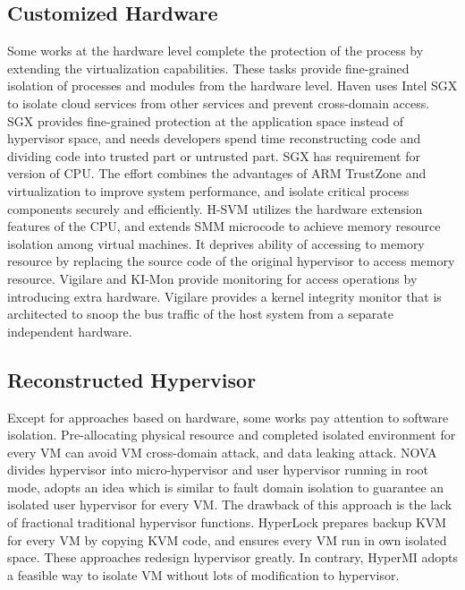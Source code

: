\documentclass[conference]{IEEEtran}
\begin{document}
\subsection{Customized Hardware }
Some works at the hardware level complete the protection of the process by extending the virtualization capabilities. These tasks provide fine-grained isolation of processes and modules from the hardware level. Haven \cite{haven} uses Intel SGX\cite{Hoekstra13cuvillo,Mckeen2013Innovative} to isolate cloud services from other services and prevent cross-domain access. SGX provides fine-grained protection at the application space instead of hypervisor space, and needs developers spend time reconstructing code and dividing code into trusted part or untrusted part. SGX has requirement for version of CPU. The effort \cite{Cho2016Hardware} combines the advantages of ARM TrustZone and virtualization to improve system performance, and isolate critical process components securely and efficiently. H-SVM\cite{Jin2015H} utilizes the hardware extension features of the CPU, and extends SMM microcode to achieve memory resource isolation among virtual machines. It deprives ability of accessing to memory resource by replacing the source code of the original hypervisor to access memory resource. Vigilare\cite{Moon2012Vigilare} and KI-Mon \cite{Lee2013KI} provide monitoring for access operations by introducing extra hardware. Vigilare provides a kernel integrity monitor that is architected to snoop the bus traffic of the host system from a separate independent hardware.

\subsection{Reconstructed Hypervisor }
Except for approaches based on hardware, some works\cite{nexen,Steinberg2010NOVA,hyperlock} pay attention to software isolation. Pre-allocating physical resource and completed isolated environment for every VM can avoid VM cross-domain attack, and data leaking attack. NOVA\cite{Steinberg2010NOVA} divides hypervisor into micro-hypervisor and user hypervisor running in root mode, adopts an idea which is similar to fault domain isolation to guarantee an isolated user hypervisor for every VM. The drawback of this approach is the lack of fractional traditional hypervisor functions. HyperLock \cite{hyperlock} prepares backup KVM for every VM by copying KVM code, and ensures every VM run in own isolated space. 
These approaches redesign hypervisor greatly. In contrary, HyperMI adopts a feasible way to isolate VM without lots of modification to hypervisor. 
\end{document}
